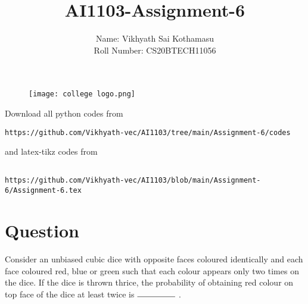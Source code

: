 \documentclass[journal,12pt,twocolumn]{IEEEtran}
\begin{document}
\title{AI1103-Assignment-6}
\author{Name: Vikhyath Sai Kothamasu\\Roll Number: CS20BTECH11056}
\maketitle
\newpage
\bigskip
\renewcommand{\thefigure}{\theenumi}
\renewcommand{\thetable}{\theenumi}

\begin{figure} [h]
    \texttt{[image: college logo.png]}
\end{figure}

Download all python codes from 
\begin{lstlisting}
https://github.com/Vikhyath-vec/AI1103/tree/main/Assignment-6/codes
\end{lstlisting}
%
and latex-tikz codes from 
%
\begin{lstlisting}

https://github.com/Vikhyath-vec/AI1103/blob/main/Assignment-6/Assignment-6.tex
\end{lstlisting}
\section*{Question}

Consider an unbiased cubic dice with opposite faces coloured identically and each face coloured red, blue or green such that each colour appears only two times on the dice. If the dice is thrown thrice, the probability of obtaining red colour on top face of the dice at least twice is $\rule{1.6cm}{0.15mm}$ .
\end{document}
